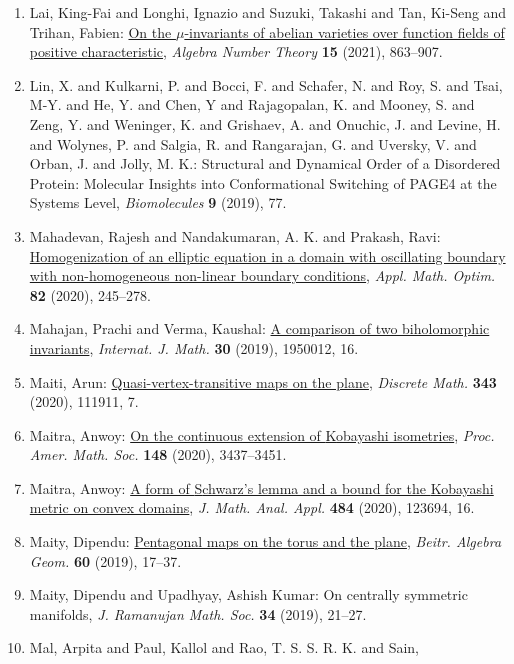 \begin{enumerate}
{equivalent characterizations}, \emph{Topology Appl.} {\bf 216} (2017), 59--73.
\item Lai, King-Fai and Longhi, Ignazio and Suzuki, Takashi and Tan,
Ki-Seng and Trihan, Fabien: \href{https://doi.org/10.2140/ant.2021.15.863}{On the {$\mu$}-invariants of abelian varieties over function
fields of positive characteristic}, \emph{Algebra Number Theory} {\bf 15} (2021), 863--907.
\item Lin, X. and Kulkarni, P. and Bocci, F. and Schafer, N. and Roy, S. and Tsai, M-Y. and He, Y. and Chen, Y and Rajagopalan, K. and Mooney, S. and Zeng, Y. and Weninger, K. and Grishaev, A. and Onuchic, J. and Levine, H. and Wolynes, P. and Salgia, R. and Rangarajan, G. and Uversky, V. and Orban, J. and Jolly, M. K.: Structural and Dynamical Order of a Disordered Protein: Molecular Insights into Conformational Switching of PAGE4 at the Systems Level, \emph{Biomolecules} {\bf 9} (2019), 77.
\item Mahadevan, Rajesh and Nandakumaran, A. K. and Prakash, Ravi: \href{https://doi.org/10.1007/s00245-018-9499-4}{Homogenization of an elliptic equation in a domain with
oscillating boundary with non-homogeneous non-linear boundary
conditions}, \emph{Appl. Math. Optim.} {\bf 82} (2020), 245--278.
\item Mahajan, Prachi and Verma, Kaushal: \href{https://doi.org/10.1142/S0129167X19500125}{A comparison of two biholomorphic invariants}, \emph{Internat. J. Math.} {\bf 30} (2019), 1950012, 16.
\item Maiti, Arun: \href{https://doi.org/10.1016/j.disc.2020.111911}{Quasi-vertex-transitive maps on the plane}, \emph{Discrete Math.} {\bf 343} (2020), 111911, 7.
\item Maitra, Anwoy: \href{https://doi.org/10.1090/proc/15038}{On the continuous extension of {K}obayashi isometries}, \emph{Proc. Amer. Math. Soc.} {\bf 148} (2020), 3437--3451.
\item Maitra, Anwoy: \href{https://doi.org/10.1016/j.jmaa.2019.123694}{A form of {S}chwarz's lemma and a bound for the {K}obayashi
metric on convex domains}, \emph{J. Math. Anal. Appl.} {\bf 484} (2020), 123694, 16.
\item Maity, Dipendu: \href{https://doi.org/10.1007/s13366-018-0405-7}{Pentagonal maps on the torus and the plane}, \emph{Beitr. Algebra Geom.} {\bf 60} (2019), 17--37.
\item Maity, Dipendu and Upadhyay, Ashish Kumar: On centrally symmetric manifolds, \emph{J. Ramanujan Math. Soc.} {\bf 34} (2019), 21--27.
\item Mal, Arpita and Paul, Kallol and Rao, T. S. S. R. K. and Sain,

\end{enumerate}
